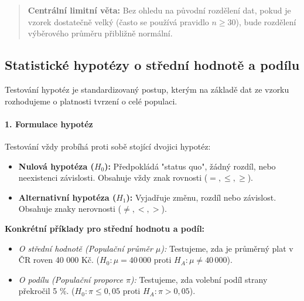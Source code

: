 \begin{quote}
    \textbf{Centrální limitní věta:} Bez ohledu na původní rozdělení dat, pokud je vzorek dostatečně velký (často se používá pravidlo $n \geq 30$), bude rozdělení výběrového průměru přibližně normální.
\end{quote}

\subsection{Statistické hypotézy o střední hodnotě a podílu}

Testování hypotéz je standardizovaný postup, kterým na základě dat ze vzorku rozhodujeme o platnosti tvrzení o celé populaci.

\paragraph*{1. Formulace hypotéz}
Testování vždy probíhá proti sobě stojící dvojici hypotéz:
\begin{itemize}
    \item \textbf{Nulová hypotéza ($H_0$):} Předpokládá "status quo", žádný rozdíl, nebo neexistenci závislosti. Obsahuje vždy znak rovnosti ($=, \leq, \geq$).
    \item \textbf{Alternativní hypotéza ($H_1$):} Vyjadřuje změnu, rozdíl nebo závislost. Obsahuje znaky nerovnosti ($\neq, <, >$). 
\end{itemize}

\textbf{Konkrétní příklady pro střední hodnotu a podíl:}
\begin{itemize}
    \item \textit{O střední hodnotě (Populační průměr $\mu$):} Testujeme, zda je průměrný plat v ČR roven 40 000 Kč. ($H_0: \mu = 40\,000$ proti $H_A: \mu \neq 40\,000$).
    \item \textit{O podílu (Populační proporce $\pi$):} Testujeme, zda volební podíl strany překročil 5 \%. ($H_0: \pi \leq 0,05$ proti $H_A: \pi > 0,05$).
\end{itemize}

